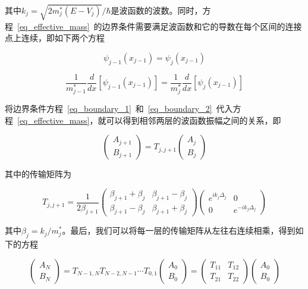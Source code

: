 \documentclass{ZJUthesis}
\begin{document}
其中$k_j=\sqrt{2 m^*_j (E-V_j)} / \hbar$是波函数的波数。同时，方程~\ref{eq_effective_mass}~的边界条件需要满足波函数和它的导数在每个区间的连接点上连续，即如下两个方程

\begin{equation}
    \label{eq_boundary_1}
    \psi_{j-1}(x_{j-1}) = \psi_j(x_{j-1}) 
\end{equation}

\begin{equation}
    \label{eq_boundary_2}
    \frac{1}{m^*_{j-1}} \frac{d}{dx} [ \psi_{j-1}(x_{j-1}) ] = \frac{1}{m^*_j} \frac{d}{dx} [\psi_j(x_{j-1})]
\end{equation}

将边界条件方程~\ref{eq_boundary_1}~和~\ref{eq_boundary_2}~代入方程~\ref{eq_effective_mass}，就可以得到相邻两层的波函数振幅之间的关系，即

\begin{equation}
    \label{eq_tmm}
    \begin{pmatrix} A_{j+1} \\ B_{j+1} \end{pmatrix} = T_{j,j+1} \begin{pmatrix} A_{j} \\ B_{j} \end{pmatrix}
\end{equation}

其中的传输矩阵为

\begin{equation}
    \label{eq_transfer_matrix}
    T_{j,j+1} = \frac{1}{2\beta_{j+1}} \begin{pmatrix} \beta_{j+1}+\beta_j & \beta_{j+1}-\beta_j  \\ \beta_{j+1}-\beta_j  & \beta_{j+1}+\beta_j  \end{pmatrix} \begin{pmatrix} e^{ik_j\Delta_j} & 0 \\ 0 & e^{-ik_j\Delta_j} \end{pmatrix}
\end{equation}

其中$\beta_j = k_j/m^*_j$。最后，我们可以将每一层的传输矩阵从左往右连续相乘，得到如下的方程

\begin{equation}
    \label{eq_tmm_serial}
    \begin{pmatrix} A_{N} \\ B_{N} \end{pmatrix} = T_{N-1,N}T_{N-2,N-1}\cdots T_{0,1} \begin{pmatrix} A_{0} \\ B_{0} \end{pmatrix} =  \begin{pmatrix} T_{11} & T_{12} \\ T_{21} & T_{22} \end{pmatrix} \begin{pmatrix} A_{0} \\ B_{0} \end{pmatrix}
\end{equation}
\end{document}

